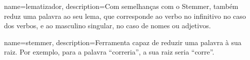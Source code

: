


 {  
    name=lematizador,
    description={Com semelhanças com o Stemmer, também reduz uma palavra ao seu lema, que corresponde ao verbo no infinitivo no caso dos verbos, e ao masculino singular, no caso de nomes ou adjetivos. }
 }
 
{
    name=stemmer,
    description={Ferramenta capaz de reduzir uma palavra à sua raiz. Por exemplo, para a palavra ``correria'', a sua raiz seria ``corre''. }
 }
 
